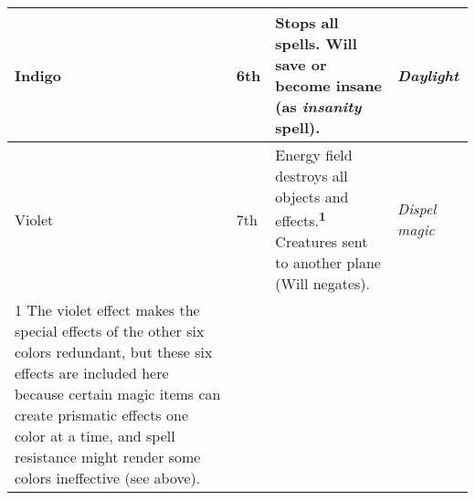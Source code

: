 \begin{longtable}{llllllll}
\hline
\multicolumn{1}{|p{0.515in}|}{\begin{minipage}[t]{0.515in}\raggedright
Indigo\end{minipage}} & \multicolumn{1}{p{0.480in}|}{\begin{minipage}[t]{0.480in}\raggedright
6th\end{minipage}} & \multicolumn{1}{p{2.513in}|}{\begin{minipage}[t]{2.513in}\raggedright
Stops all spells.\linebreak
Will save or become insane (as \textit{insanity} spell).\end{minipage}} & \multicolumn{5}{p{0.991in}|}{\begin{minipage}[t]{0.991in}\raggedright
\textit{Daylight}\end{minipage}}\\
\hline
\multicolumn{1}{|p{0.515in}|}{\begin{minipage}[t]{0.515in}\raggedright
Violet\end{minipage}} & \multicolumn{1}{p{0.480in}|}{\begin{minipage}[t]{0.480in}\raggedright
7th\end{minipage}} & \multicolumn{1}{p{2.513in}|}{\begin{minipage}[t]{2.513in}\raggedright
Energy field destroys all objects and effects.\textsuperscript{\textbf{1}}\linebreak
Creatures sent to another plane (Will negates).\end{minipage}} & \multicolumn{5}{p{0.991in}|}{\begin{minipage}[t]{0.991in}\raggedright
\textit{Dispel magic}\end{minipage}}\\
\hline
\multicolumn{1}{|p{0.515in}|}{\begin{minipage}[t]{0.515in}\raggedright
1 The violet effect makes the special effects of the other six colors redundant, 
but these six effects are included here because certain magic items can create 
prismatic effects one color at a time, and spell resistance might render some colors 
ineffective (see above).\end{minipage}}\\
\hline
\end{longtable}

